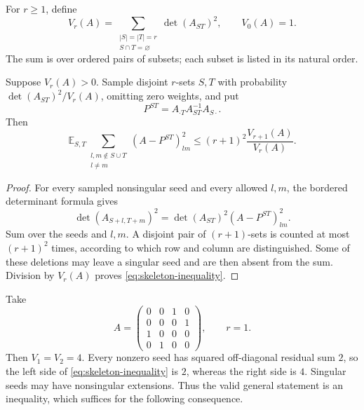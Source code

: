 For \(r\geq1\), define
\[
 V_r(A)=
 \sum_{\substack{|S|=|T|=r\\S\cap T=\varnothing}}
 \det(A_{ST})^2,\qquad V_0(A)=1.
\]
The sum is over ordered pairs of subsets; each subset is
listed in its natural order.

\begin{lemma}
\label{lem:skeleton}
Suppose \(V_r(A)>0\).  Sample disjoint \(r\)-sets \(S,T\)
with probability \(\det(A_{ST})^2/V_r(A)\), omitting zero
weights, and put
\[
 P^{ST}=A_{\cdot T}A_{ST}^{-1}A_{S\cdot}.
\]
Then
\begin{equation}
 \mathbb E_{S,T}
 \sum_{\substack{l,m\notin S\cup T\\l\ne m}}
 (A-P^{ST})_{lm}^2
 \leq(r+1)^2\frac{V_{r+1}(A)}{V_r(A)}.
 \label{eq:skeleton-inequality}
\end{equation}
\end{lemma}
\begin{proof}
For every sampled nonsingular seed and every allowed \(l,m\),
the bordered determinant formula gives
\[
 \det(A_{S+l,T+m})^2
 =\det(A_{ST})^2(A-P^{ST})_{lm}^2.
\]
Sum over the seeds and \(l,m\).  A disjoint pair of
\((r+1)\)-sets is counted at most \((r+1)^2\) times,
according to which row and column are distinguished.
Some of these deletions may leave a singular seed and are
then absent from the sum.  Division by \(V_r(A)\) proves
\eqref{eq:skeleton-inequality}.
\end{proof}

\begin{remark}
\label{rem:skeleton-zero-seeds}
Take
\[
 A=\begin{pmatrix}
 0&0&1&0\\0&0&0&1\\1&0&0&0\\0&1&0&0
 \end{pmatrix},\qquad r=1.
\]
Then \(V_1=V_2=4\).  Every nonzero seed has squared
off-diagonal residual sum \(2\), so the left side of
\eqref{eq:skeleton-inequality} is \(2\), whereas the
right side is \(4\).  Singular seeds may have nonsingular
extensions.  Thus the valid general statement is an
inequality, which suffices for the following consequence.
\end{remark}

